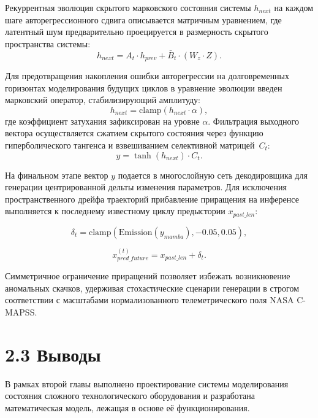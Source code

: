 \documentclass[14pt, a4paper, oneside]{extreport}
\begin{document}
Рекуррентная эволюция скрытого марковского состояния системы $h_{next}$ на каждом шаге авторегрессионного сдвига описывается  матричным уравнением, где латентный шум предварительно проецируется в размерность скрытого пространства системы:
\begin{equation}
h_{next} = A_t \cdot h_{prev} + \bar{B}_t \cdot \left(W_z \cdot Z\right).
\end{equation}

Для предотвращения накопления ошибки авторегрессии на долговременных горизонтах моделирования будущих циклов в уравнение эволюции введен марковский оператор, стабилизирующий амплитуду:
\begin{equation}
h_{next} = \text{clamp}\left(h_{next} \cdot \alpha\right),
\end{equation}
где коэффициент затухания зафиксирован на уровне $\alpha$. Фильтрация выходного вектора осуществляется сжатием скрытого состояния через функцию гиперболического тангенса и взвешиванием селективной матрицей~$C_t$:
\begin{equation}
y = \tanh(h_{next}) \cdot C_t.
\end{equation}

На финальном этапе вектор $y$ подается в многослойную сеть декодировщика для генерации центрированной дельты изменения параметров. Для исключения пространственного дрейфа траекторий прибавление приращения на инференсе выполняется к последнему известному циклу предыстории $x_{past\_len}$:

\begin{equation}
\delta_t = \text{clamp}\left(\text{Emission}(y_{mamba}), -0.05, 0.05\right),
\end{equation}

\begin{equation}
x_{pred\_future}^{(t)} = x_{past\_len} + \delta_t.
\end{equation}

Симметричное ограничение приращений позволяет избежать возникновение аномальных скачков, удерживая стохастические сценарии генерации в строгом соответствии с масштабами нормализованного телеметрического поля NASA C-MAPSS.

\vspace{1em}
\section{2.3 Выводы}
\vspace{1em}

В рамках второй главы выполнено проектирование системы моделирования состояния сложного технологического оборудования и разработана математическая модель, лежащая в основе её функционирования.
\end{document}
